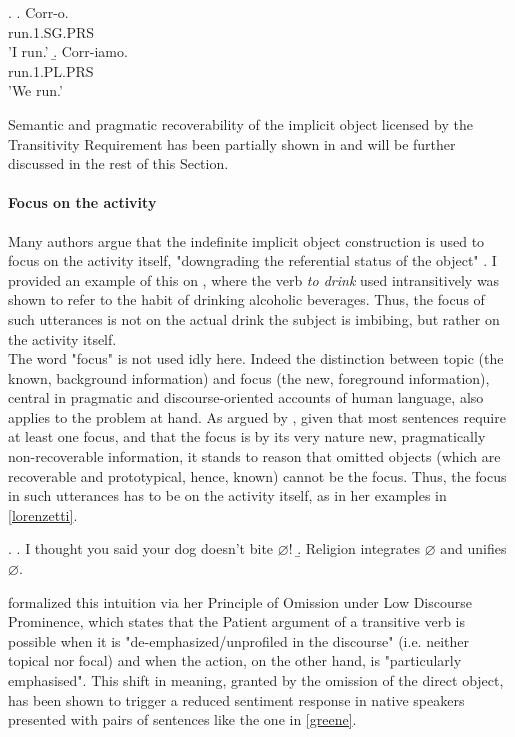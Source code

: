 \ex. \label{epp_intro} \a. \label{epp_intro1} Corr-o. \\ run.1.SG.PRS \\ 'I run.'
\b. \label{epp_intro2} Corr-iamo. \\ run.1.PL.PRS \\ 'We run.'

Semantic and pragmatic recoverability of the implicit object licensed by the Transitivity Requirement has been partially shown in  and will be further discussed in the rest of this Section.


\paragraph{Focus on the activity} 

Many authors \parencite{Liu2008, Garcia-VelascoMunoz2002, Fillmore1986, Ahringberg2015, Levin1993, Yasutake1987, Goldberg2005} argue that the indefinite implicit object construction is used to focus on the activity itself, "downgrading the referential status of the object" \parencite[7-8]{Garcia-VelascoMunoz2002}. I provided an example of this on , where the verb \textit{to drink} used intransitively was shown to refer to the habit of drinking alcoholic beverages. Thus, the focus of such utterances is not on the actual drink the subject is imbibing, but rather on the activity itself.\\
The word "focus" is not used idly here. Indeed the distinction between topic (the known, background information) and focus (the new, foreground information), central in pragmatic and discourse-oriented accounts of human language, also applies to the problem at hand. As argued by \textcite[66]{Lorenzetti2008}, given that most sentences require at least one focus, and that the focus is by its very nature new, pragmatically non-recoverable information, it stands to reason that omitted objects (which are recoverable and prototypical, hence, known) cannot be the focus. Thus, the focus in such utterances has to be on the activity itself, as in her examples in \ref{lorenzetti}.

\ex. \label{lorenzetti} \a. \label{lorenzetti1} I thought you said your dog doesn’t bite $\varnothing$!
\b. \label{lorenzetti2} Religion integrates $\varnothing$ and unifies $\varnothing$.

\textcite{Goldberg2005} formalized this intuition via her Principle of Omission under Low Discourse Prominence, which states that the Patient argument of a transitive verb is possible when it is "de-emphasized/unprofiled in the discourse" (i.e. neither topical nor focal) and when the action, on the other hand, is "particularly emphasised". This shift in meaning, granted by the omission of the direct object, has been shown \parencite[507]{GreeneResnik2009more} to trigger a reduced sentiment response in native speakers presented with pairs of sentences like the one in \ref{greene}.

